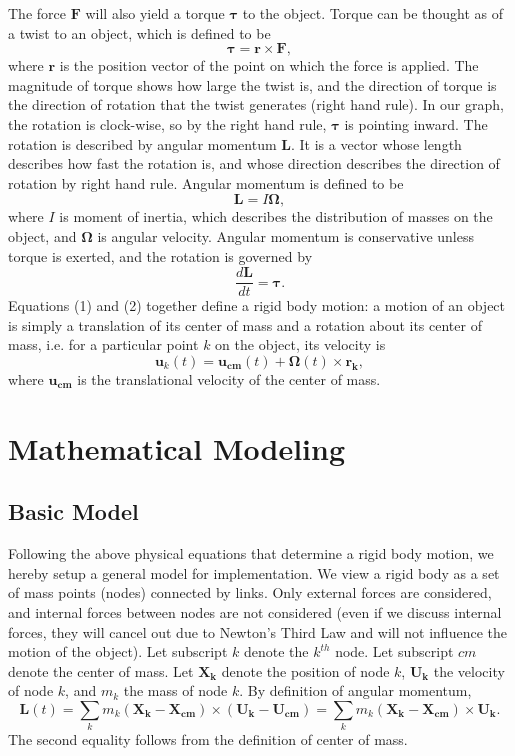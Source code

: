 \documentclass[12pt]{article}
\renewcommand{\(}{\left (}
\renewcommand{\)}{\right )}
\renewcommand{\vec}[1]{\boldsymbol{#1}}
\begin{document}
The force $\vec{F}$ will also yield a torque $\vec{\tau}$ to the object. Torque can be thought as of a twist to an object, which is defined to be $$\vec{\tau} = \vec{r} \times \vec{F},$$ where $\vec{r}$ is the position vector of the point on which the force is applied. The magnitude of torque shows how large the twist is, and the direction of torque is the direction of rotation that the twist generates (right hand rule). In our graph, the rotation is clock-wise, so by the right hand rule, $\vec{\tau}$ is pointing inward. The rotation is described by angular momentum $\vec{L}.$ It is a vector whose length describes how fast the rotation is, and whose direction describes the direction of rotation by right hand rule. Angular momentum is defined to be $$\vec{L} = I\vec{\Omega},$$ where $I$ is moment of inertia, which describes the distribution of masses on the object, and $\vec{\Omega}$ is angular velocity. Angular momentum is conservative unless torque is exerted, and the rotation is governed by
\begin{equation}
\frac{d\vec{L}}{dt} = \vec{\tau}.
\end{equation}
\hspace{5mm} Equations (1) and (2) together define a rigid body motion: a motion of an object is simply a translation of its center of mass and a rotation about its center of mass, i.e. for a particular point $k$ on the object, its velocity is \begin{equation}
\vec{u}_k (t) = \vec{u_{cm}} (t) + \vec{\Omega}(t) \times \vec{r_k},
\end{equation} where $\vec{u_{cm}}$ is the translational velocity of the center of mass.



\section{Mathematical Modeling}
\subsection{Basic Model}

\hspace{5mm} Following the above physical equations that determine a rigid body motion, we hereby setup a general model for implementation. We view a rigid body as a set of mass points (nodes) connected by links. Only external forces are considered, and internal forces between nodes are not considered (even if we discuss internal forces, they will cancel out due to Newton's Third Law and will not influence the motion of the object). Let subscript $k$ denote the $k^{th}$ node. Let subscript $cm$ denote the center of mass. Let $\vec{X_k}$ denote the position of node $k$, $\vec{U_k}$ the velocity of node $k$, and $m_k$ the mass of node $k.$ By definition of angular momentum, \begin{equation}
    \vec{L}(t) = \sum_k m_k (\vec{X_k} - \vec{X_{cm}}) \times (\vec{U_k} - \vec{U_{cm}}) = \sum_k m_k (\vec{X_k} - \vec{X_{cm}}) \times \vec{U_k}.
\end{equation}
The second equality follows from the definition of center of mass.
\end{document}
